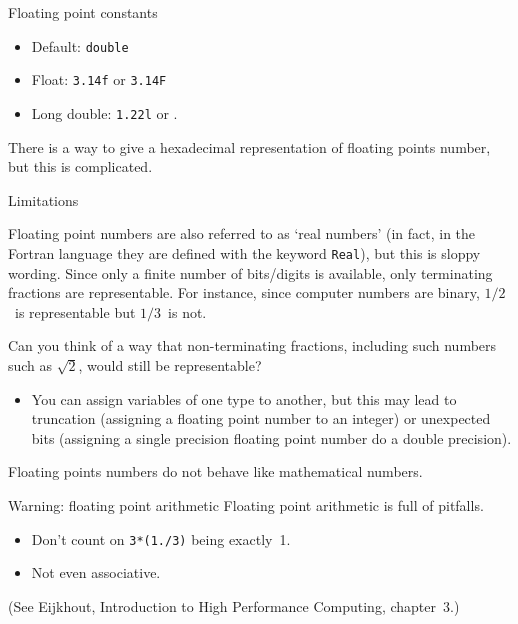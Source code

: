 \begin{slide}{Floating point constants}
  \label{sl:float-vars}
  \begin{itemize}
  \item Default: \lstinline{double}
  \item Float: \lstinline{3.14f} or \lstinline{3.14F}
  \item Long double: \lstinline{1.22l} or .
  \end{itemize}
\end{slide}

There is a way to give a 
hexadecimal representation of floating points number, but this is complicated.

 {Limitations}

Floating point numbers are also referred to as `real numbers'
(in fact, in the Fortran language they are defined
with the keyword \lstinline{Real}),
but this is sloppy wording.
Since only a finite number of bits/digits is available,
only terminating fractions are representable.
For instance, since computer numbers are binary,
$1/2$~is representable but $1/3$~is not.

\begin{exercise}
  \label{ex:float-irrat}
  Can you think of a way that non-terminating fractions,
  including such numbers such as $\sqrt 2$,
  would still be representable?
\end{exercise}

\begin{itemize}
\item You can assign variables of one type to another, but this may
  lead to truncation (assigning a floating point number to an integer)
  or unexpected bits (assigning a single precision floating point
  number do a double precision).
\end{itemize}

Floating points numbers do not behave like mathematical numbers. 

\begin{block}{Warning: floating point arithmetic}
  \label{sl:float-arith}
  Floating point arithmetic is full of pitfalls.
  \begin{itemize}
  \item Don't count on \lstinline{3*(1./3)} being exactly~1.
  \item Not even associative.
  \end{itemize}
  (See Eijkhout, Introduction to High Performance Computing, chapter~3.)
\end{block}

